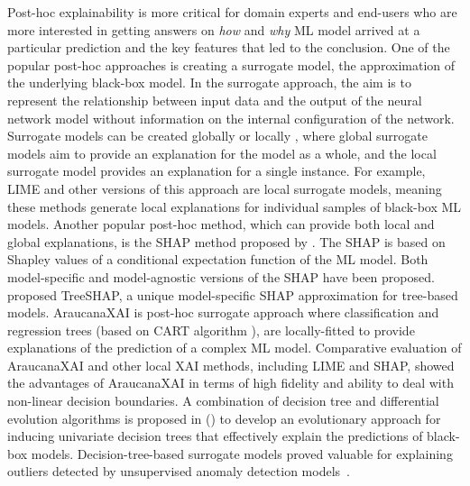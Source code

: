 Post-hoc explainability is more critical for domain experts and end-users who are more interested in getting answers on \textit{how} and \textit{why} ML model arrived at a particular prediction and the key features that led to the conclusion. One of the popular post-hoc approaches is creating a surrogate model, the approximation of the underlying black-box model. In the surrogate approach, the aim is to represent the relationship between input data and the output of the neural network model without information on the internal configuration of the network. Surrogate models can be created globally or locally \citep{ali}, where global surrogate models aim to provide an explanation for the model as a whole, and the local surrogate model provides an explanation for a single instance. For example, LIME \citep{lime} and other versions of this approach \citep{alime, tree_alime} are local surrogate models, meaning these methods generate local explanations for individual samples of black-box ML models. Another popular post-hoc method, which can provide both local and global explanations, is the SHAP method proposed by \citet{shap}. The SHAP is based on Shapley values of a conditional expectation function of the ML model. Both model-specific and model-agnostic versions of the SHAP have been proposed. \citet{TreeSHAP} proposed TreeSHAP, a unique model-specific SHAP approximation for tree-based models. AraucanaXAI \citep{Araucana} is post-hoc surrogate approach where classification and regression trees (based on CART algorithm \citep{CART}), are locally-fitted to provide explanations of the prediction of a complex ML model. Comparative evaluation of AraucanaXAI and other local XAI methods, including LIME and SHAP, showed the advantages of AraucanaXAI in terms of high fidelity and ability to deal with non-linear decision boundaries. A combination of decision tree and differential evolution algorithms is proposed in (\citep{Rivera2024}) to develop an evolutionary approach for inducing univariate decision trees that effectively explain the predictions of black-box models. Decision-tree-based surrogate models proved valuable for explaining outliers detected by unsupervised anomaly detection models~\citep{Savic2022}.

